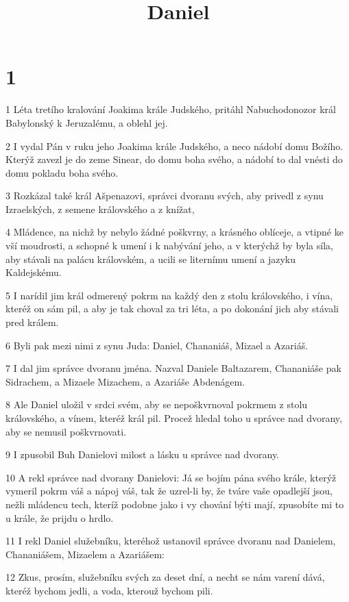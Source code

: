 

\title{Daniel}

\chapter{1}

\par 1 Léta tretího kralování Joakima krále Judského, pritáhl Nabuchodonozor král Babylonský k Jeruzalému, a oblehl jej.
\par 2 I vydal Pán v ruku jeho Joakima krále Judského, a neco nádobí domu Božího. Kterýž zavezl je do zeme Sinear, do domu boha svého, a nádobí to dal vnésti do domu pokladu boha svého.
\par 3 Rozkázal také král Ašpenazovi, správci dvoranu svých, aby privedl z synu Izraelských, z semene královského a z knížat,
\par 4 Mládence, na nichž by nebylo žádné poškvrny, a krásného oblíceje, a vtipné ke vší moudrosti, a schopné k umení i k nabývání jeho, a v kterýchž by byla síla, aby stávali na palácu královském, a ucili se liternímu umení a jazyku Kaldejskému.
\par 5 I narídil jim král odmerený pokrm na každý den z stolu královského, i vína, kteréž on sám pil, a aby je tak choval za tri léta, a po dokonání jich aby stávali pred králem.
\par 6 Byli pak mezi nimi z synu Juda: Daniel, Chananiáš, Mizael a Azariáš.
\par 7 I dal jim správce dvoranu jména. Nazval Daniele Baltazarem, Chananiáše pak Sidrachem, a Mizaele Mizachem, a Azariáše Abdenágem.
\par 8 Ale Daniel uložil v srdci svém, aby se nepoškvrnoval pokrmem z stolu královského, a vínem, kteréž král pil. Procež hledal toho u správce nad dvorany, aby se nemusil poškvrnovati.
\par 9 I zpusobil Buh Danielovi milost a lásku u správce nad dvorany.
\par 10 A rekl správce nad dvorany Danielovi: Já se bojím pána svého krále, kterýž vymeril pokrm váš a nápoj váš, tak že uzrel-li by, že tváre vaše opadlejší jsou, nežli mládencu tech, kteríž podobne jako i vy chování býti mají, zpusobíte mi to u krále, že prijdu o hrdlo.
\par 11 I rekl Daniel služebníku, kteréhož ustanovil správce dvoranu nad Danielem, Chananiášem, Mizaelem a Azariášem:
\par 12 Zkus, prosím, služebníku svých za deset dní, a necht se nám varení dává, kteréž bychom jedli, a voda, kterouž bychom pili.
